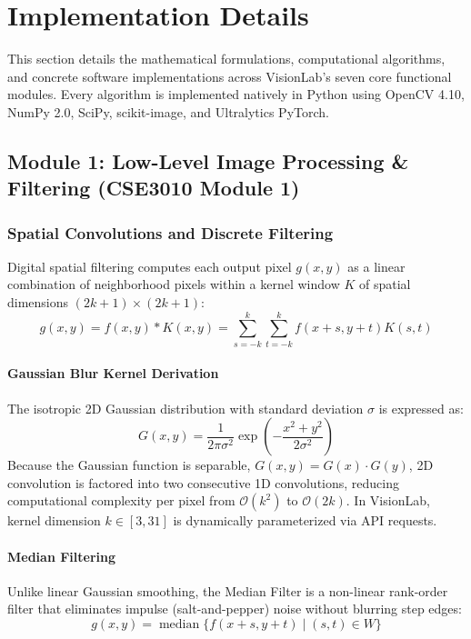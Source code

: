 \section{Implementation Details}

This section details the mathematical formulations, computational algorithms, and concrete software implementations across VisionLab's seven core functional modules. Every algorithm is implemented natively in Python using OpenCV 4.10, NumPy 2.0, SciPy, scikit-image, and Ultralytics PyTorch.

\subsection{Module 1: Low-Level Image Processing \& Filtering (CSE3010 Module 1)}

\subsubsection{Spatial Convolutions and Discrete Filtering}
Digital spatial filtering computes each output pixel $g(x,y)$ as a linear combination of neighborhood pixels within a kernel window $K$ of spatial dimensions $(2k+1) \times (2k+1)$:
\begin{equation}
    g(x,y) = f(x,y) * K(x,y) = \sum_{s=-k}^k \sum_{t=-k}^k f(x+s, y+t) K(s, t)
\end{equation}

\paragraph{Gaussian Blur Kernel Derivation}
The isotropic 2D Gaussian distribution with standard deviation $\sigma$ is expressed as:
\begin{equation}
    G(x,y) = \frac{1}{2\pi\sigma^2} \exp\left( -\frac{x^2 + y^2}{2\sigma^2} \right)
\end{equation}
Because the Gaussian function is separable, $G(x,y) = G(x) \cdot G(y)$, 2D convolution is factored into two consecutive 1D convolutions, reducing computational complexity per pixel from $\mathcal{O}(k^2)$ to $\mathcal{O}(2k)$. In VisionLab, kernel dimension $k \in [3, 31]$ is dynamically parameterized via API requests.

\paragraph{Median Filtering}
Unlike linear Gaussian smoothing, the Median Filter is a non-linear rank-order filter that eliminates impulse (salt-and-pepper) noise without blurring step edges:
\begin{equation}
    g(x,y) = \operatorname{median} \Big\{ f(x+s, y+t) \;\Big|\; (s,t) \in W \Big\}
\end{equation}

